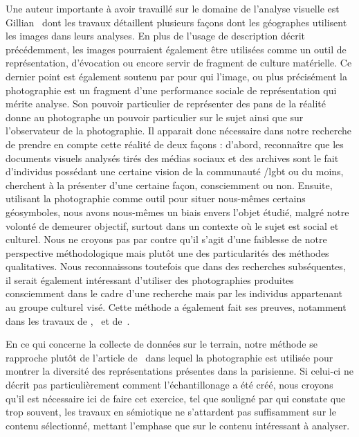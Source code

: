 Une auteur importante à avoir travaillé sur le domaine de l'analyse visuelle est Gillian~\citet{Rose2008} dont les travaux détaillent plusieurs façons dont les géographes utilisent les images dans leurs analyses. 
En plus de l'usage de description décrit précédemment, les images pourraient également être utilisées comme un outil de représentation, d'évocation ou encore servir de fragment de culture matérielle. 
Ce dernier point est également soutenu par \citet{Frosh2001} pour qui l'image, ou plus précisément la photographie est un fragment d'une performance sociale de représentation qui mérite analyse. 
Son pouvoir particulier de représenter des pans de la réalité donne au photographe un pouvoir particulier sur le sujet ainsi que sur l'observateur de la photographie.
Il apparait donc nécessaire dans notre recherche de prendre en compte cette réalité de deux façons : d'abord, reconnaître que les documents visuels analysés tirés des médias sociaux et des archives sont le fait d'individus possédant une certaine vision de la communauté /lgbt{} ou du moins, cherchent à la présenter d'une certaine façon, consciemment ou non. 
Ensuite, utilisant la photographie comme outil pour situer nous-mêmes certains géosymboles, nous avons nous-mêmes un biais envers l'objet étudié, malgré notre volonté de demeurer objectif, surtout dans un contexte où le sujet est social et culturel. 
Nous ne croyons pas par contre qu'il s'agit d'une faiblesse de notre perspective méthodologique mais plutôt une des particularités des méthodes qualitatives. 
Nous reconnaissons toutefois que dans des recherches subséquentes, il serait également intéressant d'utiliser des photographies produites consciemment dans le cadre d'une recherche mais par les individus appartenant au groupe culturel visé. 
Cette méthode a également fait ses preuves, notamment dans les travaux de \citet{Kwan2008},~\citet{Moore2008} et de~\citet{Markwell2000}.

En ce qui concerne la collecte de données sur le terrain, notre méthode se rapproche plutôt de l'article de~\citet{Leroy2010} dans lequel la photographie est utilisée pour montrer la diversité des représentations présentes dans la  parisienne. 
Si celui-ci ne décrit pas particulièrement comment l'échantillonage a été créé, nous croyons qu'il est nécessaire ici de faire cet exercice, tel que souligné par \citet[109]{Rose2012} qui constate que trop souvent, les travaux en sémiotique ne s'attardent pas suffisamment sur le contenu sélectionné, mettant l'emphase que sur le contenu intéressant à analyser.


